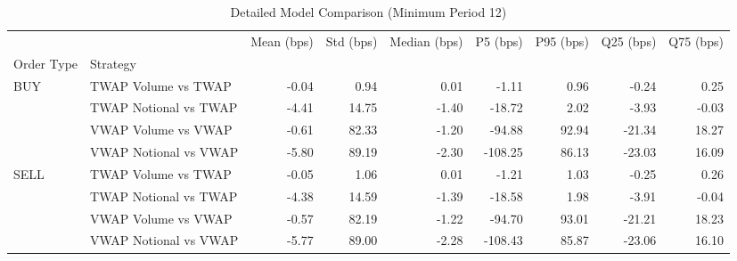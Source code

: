 \begin{table}
\caption{Detailed Model Comparison (Minimum Period 12)}
\label{tab:detailed_min_period_12}
\begin{tabular}{l|l|rrrrrrr}
\toprule
 &  & Mean (bps) & Std (bps) & Median (bps) & P5 (bps) & P95 (bps) & Q25 (bps) & Q75 (bps) \\
Order Type & Strategy &  &  &  &  &  &  &  \\
\midrule
\multirow[t]{4}{*}{BUY} & TWAP Volume vs TWAP & -0.04 & 0.94 & 0.01 & -1.11 & 0.96 & -0.24 & 0.25 \\
 & TWAP Notional vs TWAP & -4.41 & 14.75 & -1.40 & -18.72 & 2.02 & -3.93 & -0.03 \\
 & VWAP Volume vs VWAP & -0.61 & 82.33 & -1.20 & -94.88 & 92.94 & -21.34 & 18.27 \\
 & VWAP Notional vs VWAP & -5.80 & 89.19 & -2.30 & -108.25 & 86.13 & -23.03 & 16.09 \\
\cline{1-9}
\multirow[t]{4}{*}{SELL} & TWAP Volume vs TWAP & -0.05 & 1.06 & 0.01 & -1.21 & 1.03 & -0.25 & 0.26 \\
 & TWAP Notional vs TWAP & -4.38 & 14.59 & -1.39 & -18.58 & 1.98 & -3.91 & -0.04 \\
 & VWAP Volume vs VWAP & -0.57 & 82.19 & -1.22 & -94.70 & 93.01 & -21.21 & 18.23 \\
 & VWAP Notional vs VWAP & -5.77 & 89.00 & -2.28 & -108.43 & 85.87 & -23.06 & 16.10 \\
\cline{1-9}
\bottomrule
\end{tabular}
\end{table}
